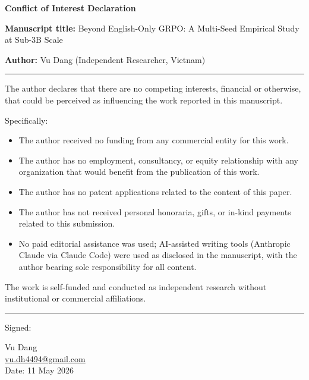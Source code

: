 \documentclass[11pt]{article}
\begin{document}
\begin{center}
\Large\textbf{Conflict of Interest Declaration}
\end{center}

\vspace{1em}

\noindent\textbf{Manuscript title:} Beyond English-Only GRPO: A Multi-Seed
Empirical Study at Sub-3B Scale

\noindent\textbf{Author:} Vu Dang (Independent Researcher, Vietnam)

\vspace{1em}\hrule\vspace{1em}

\noindent The author declares that there are no competing interests,
financial or otherwise, that could be perceived as influencing the work
reported in this manuscript.

\medskip

\noindent Specifically:
\begin{itemize}\itemsep0pt
\item The author received no funding from any commercial entity for this
      work.
\item The author has no employment, consultancy, or equity relationship
      with any organization that would benefit from the publication of
      this work.
\item The author has no patent applications related to the content of
      this paper.
\item The author has not received personal honoraria, gifts, or in-kind
      payments related to this submission.
\item No paid editorial assistance was used; AI-assisted writing tools
      (Anthropic Claude via Claude Code) were used as disclosed in the
      manuscript, with the author bearing sole responsibility for all
      content.
\end{itemize}

\medskip

\noindent The work is self-funded and conducted as independent research
without institutional or commercial affiliations.

\vspace{2em}\hrule\vspace{1em}

\noindent Signed:

\medskip

\noindent Vu Dang \\
\href{mailto:vu.dh4494@gmail.com}{vu.dh4494@gmail.com} \\
Date: 11 May 2026
\end{document}
